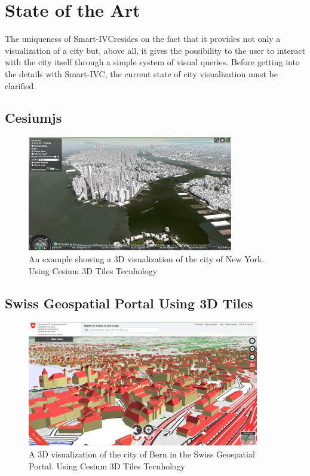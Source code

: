 \documentclass[]{usiinfbachelorproject}
\newcommand{\applicationName}{Smart-IVC}
\begin{document}
\section{State of the Art} \label{stateOfTheArt}
The uniqueness of \applicationName resides on the fact that it provides not only a visualization of a city but, above all, it gives the possibility to the user to interact with the city itself through a simple system of visual queries.
Before getting into the details with \applicationName, the current state of city visualization must be clarified.

\subsection{Cesiumjs}
\begin{figure} [h]
\centering
\includegraphics[width=0.8\textwidth]{images/NewYorkCityCesium3dTiles}
\caption{An example showing a 3D visualization of the city of New York. Using Cesium 3D Tiles Tecnhology}
\label{fig:NewYorkCityCesium3dTiles}
\end{figure}
\subsection{Swiss Geospatial Portal Using 3D Tiles}
\begin{figure} [h]
\centering
\includegraphics[width=0.9\textwidth]{images/BernCitySwissTopo}
\caption{A 3D visualization of the city of Bern in the Swiss Geospatial Portal. Using Cesium 3D Tiles Tecnhology}
\label{fig:BernCitySwissTopo}
\end{figure}
\end{document}

